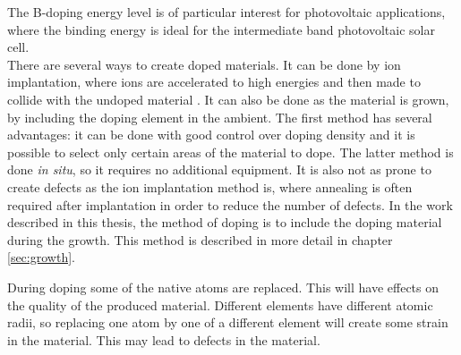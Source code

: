 The B-doping energy level is of particular interest for photovoltaic applications, where the binding energy is ideal for the intermediate band photovoltaic solar cell. %
\\ 

\noindent 
There are several ways to create doped materials. It can be done by ion implantation, where ions are accelerated to high energies and then made to collide with the undoped material \cite{Rao1999}. It can also be done as the material is grown, by including the doping element in the ambient. The first method has several advantages: it can be done with good control over doping density and it is possible to select only certain areas of the material to dope. The latter method is done \emph{in situ}, so it requires no additional equipment. It is also not as prone to create defects as the ion implantation method is, where annealing is often required after implantation in order to reduce the number of defects. In the work described in this thesis, the method of doping is to include the doping material during the growth. This method is described in more detail in chapter \ref{sec:growth}. 

During doping some of the native atoms are replaced. This will have effects on the quality of the produced material. Different elements have different atomic radii, so replacing one atom by one of a different element will create some strain in the material. This may lead to defects in the material. 




































